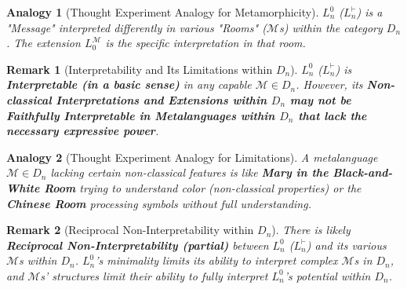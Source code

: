\documentclass{article}
\newtheorem{remark}{Remark}[section] %
\newtheorem{analogy}{Analogy}[section] %
\begin{document}
																																																															\begin{analogy}[Thought Experiment Analogy for Metamorphicity]
																																																																$L^0_n$ ($L^{\vdash}_n$) is a "Message" interpreted differently in various "Rooms" ($\mathcal{M}$s) within the category $D_n$. The extension $L_0^{\mathcal{M}}$ is the specific interpretation in that room.
																																																																\end{analogy}
																																																																	
																																																																	\begin{remark}[Interpretability and Its Limitations within $D_n$]
																																																																		$L^0_n$ ($L^{\vdash}_n$) is \textbf{Interpretable (in a basic sense)} in any capable $\mathcal{M} \in D_n$. However, its \textbf{Non-classical Interpretations and Extensions within $D_n$ may not be Faithfully Interpretable in Metalanguages within $D_n$ that lack the necessary expressive power}.
																																																																		\end{remark}
																																																																			
																																																																			\begin{analogy}[Thought Experiment Analogy for Limitations]
																																																																				A metalanguage $\mathcal{M} \in D_n$ lacking certain non-classical features is like \textbf{Mary in the Black-and-White Room} trying to understand color (non-classical properties) or the \textbf{Chinese Room} processing symbols without full understanding.
																																																																				\end{analogy}
																																																																					
																																																																					\begin{remark}[Reciprocal Non-Interpretability within $D_n$]
																																																																						There is likely \textbf{Reciprocal Non-Interpretability (partial)} between $L^0_n$ ($L^{\vdash}_n$) and its various $\mathcal{M}$s within $D_n$. $L^0_n$'s minimality limits its ability to interpret complex $\mathcal{M}$s in $D_n$, and $\mathcal{M}$s' structures limit their ability to fully interpret $L^0_n$'s potential within $D_n$.
																																																																						\end{remark}
																																																																							
\end{document}
